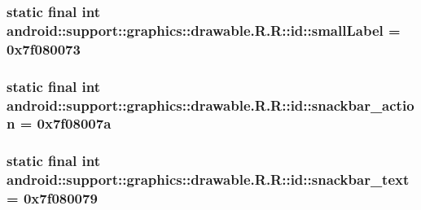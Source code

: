 \hypertarget{classandroid_1_1support_1_1graphics_1_1drawable_1_1_r_1_1id_fd44e0b7c5f8a08f9fd1c5082a54c4a0}{
\subsubsection[{smallLabel}]{\setlength{\rightskip}{0pt plus 5cm}static final int android::support::graphics::drawable.R.R::id::smallLabel = 0x7f080073}}
\label{classandroid_1_1support_1_1graphics_1_1drawable_1_1_r_1_1id_fd44e0b7c5f8a08f9fd1c5082a54c4a0}


\hypertarget{classandroid_1_1support_1_1graphics_1_1drawable_1_1_r_1_1id_2d7713d0acf05132d4ca43daef48659f}{
\subsubsection[{snackbar\_\-action}]{\setlength{\rightskip}{0pt plus 5cm}static final int android::support::graphics::drawable.R.R::id::snackbar\_\-action = 0x7f08007a}}
\label{classandroid_1_1support_1_1graphics_1_1drawable_1_1_r_1_1id_2d7713d0acf05132d4ca43daef48659f}


\hypertarget{classandroid_1_1support_1_1graphics_1_1drawable_1_1_r_1_1id_3f20859208813db5159aba1528e2e6c8}{
\subsubsection[{snackbar\_\-text}]{\setlength{\rightskip}{0pt plus 5cm}static final int android::support::graphics::drawable.R.R::id::snackbar\_\-text = 0x7f080079}}
\label{classandroid_1_1support_1_1graphics_1_1drawable_1_1_r_1_1id_3f20859208813db5159aba1528e2e6c8}


